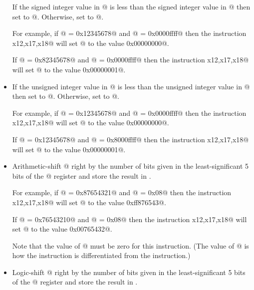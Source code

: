 \begin{itemize}
If the signed integer value in @ is less than the
signed integer value in @ then set \verb@rd@ to @.
Otherwise, set \verb@rd@ to @.

For example, if @ = \verb@0x12345678@ and @ = \verb@0x0000ffff@
then the instruction \verb@slt x12,x17,x18@ will set @ to the
value \verb@0x00000000@.

If @ = \verb@0x82345678@ and @ = \verb@0x0000ffff@
then the instruction \verb@slt x12,x17,x18@ will set @ to the
value \verb@0x00000001@.

\item{}
\label{insn:sltu}

If the unsigned integer value in @ is less than the
unsigned integer value in @ then set \verb@rd@ to @.
Otherwise, set \verb@rd@ to @.

For example, if @ = \verb@0x12345678@ and @ = \verb@0x0000ffff@
then the instruction \verb@sltu x12,x17,x18@ will set @ to the
value \verb@0x00000000@.

If @ = \verb@0x12345678@ and @ = \verb@0x8000ffff@
then the instruction \verb@sltu x12,x17,x18@ will set @ to the
value \verb@0x00000001@.

\item{}
\label{insn:sra}

Arithmetic-shift @ right by the number of bits given in the least-significant 
5 bits of the @ register and store the result in 
\verb@rd@.

For example, if @ = \verb@0x87654321@ and @ = \verb@0x08@
then the instruction \verb@sra x12,x17,x18@ will set @ to the
value \verb@0xff876543@.

If @ = \verb@0x76543210@ and @ = \verb@0x08@
then the instruction \verb@sra x12,x17,x18@ will set @ to the
value \verb@0x00765432@.

Note that the value of @ must be zero for this instruction.
(The value of @ is how the \verb@sra@ instruction is differentiated 
from the \verb@srl@ instruction.)

\item{}
\label{insn:srl}

Logic-shift @ right by the number of bits given in the least-significant 
5 bits of the @ register and store the result in 
\verb@rd@.


\end{itemize}
